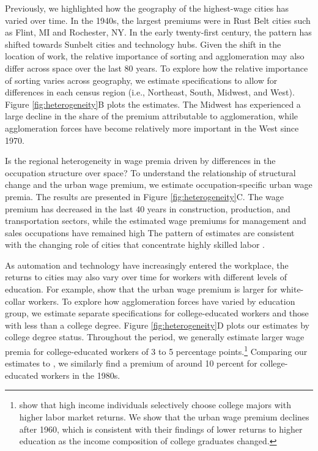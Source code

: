 \documentclass[12pt]{article}
\begin{document}
Previously, we highlighted how the geography of the highest-wage cities has varied over time.
In the 1940s, the largest premiums were in Rust Belt cities such as Flint, MI and Rochester, NY.
In the early twenty-first century, the pattern has shifted towards Sunbelt cities and technology hubs.
Given the shift in the location of work, the relative importance of sorting and agglomeration may also differ across space over the last 80 years.
To explore how the relative importance of sorting varies across geography, we estimate specifications to allow for differences in each census region (i.e., Northeast, South, Midwest, and West).
Figure \ref{fig:heterogeneity}B plots the estimates.
The Midwest has experienced a large decline in the share of the premium attributable to agglomeration, while agglomeration forces have become relatively more important in the West since 1970. 

Is the regional heterogeneity in wage premia driven by differences in the occupation structure over space? 
To understand the relationship of structural change and the urban wage premium, we estimate occupation-specific urban wage premia.
The results are presented in Figure \ref{fig:heterogeneity}C.
The wage premium has decreased in the last 40 years in construction, production, and transportation sectors, while the estimated wage premiums for management and sales occupations have remained high
The pattern of estimates are consistent with the changing role of cities that concentrate highly skilled labor \citep{moretti2004human,shapiro2006smart,davis2020comparative,diamond2021spatial}.

As automation and technology have increasingly entered the workplace, the returns to cities may also vary over time for workers with different levels of education.
For example, \citet{gould2007cities} show that the urban wage premium is larger for white-collar workers.
To explore how agglomeration forces have varied by education group, we estimate separate specifications for college-educated workers and those with less than a college degree.
Figure \ref{fig:heterogeneity}D plots our estimates by college degree status.
Throughout the period, we generally estimate larger wage premia for college-educated workers of 3 to 5 percentage points.\footnote{\citet*{bleemer2025changes} show that high income individuals selectively choose college majors with higher labor market returns. We show that the urban wage premium declines after 1960, which is consistent with their findings of lower returns to higher education as the income composition of college graduates changed.}
Comparing our estimates to \citet{gould2007cities}, we similarly find a premium of around 10 percent for college-educated workers in the 1980s. 
\end{document}
